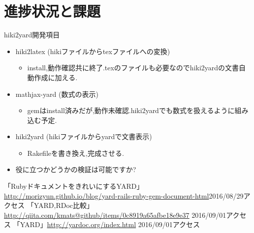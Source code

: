 \documentclass[10pt,a4j,twocolumn]{jsarticle}
\begin{document}
\section{進捗状況と課題}
hiki2yard開発項目
\begin{itemize}
\item hiki2latex (hikiファイルからtexファイルへの変換)\begin{itemize}
\item install,動作確認共に終了.texのファイルも必要なのでhiki2yardの文書自動作成に加える.
\end{itemize}
\item mathjax-yard  (数式の表示)\begin{itemize}
\item gemはinstall済みだが,動作未確認.hiki2yardでも数式を扱えるように組み込む予定.
\end{itemize}
\item hiki2yard (hikiファイルからyardで文書表示)\begin{itemize}
\item Rakefileを書き換え,完成させる.
\end{itemize}
\end{itemize}\begin{itemize}
\item 役に立つかどうかの検証は可能ですか?
\end{itemize}

\begin{thebibliography}{3}
「RubyドキュメントをきれいにするYARD」\url{http://morizyun.github.io/blog/yard-rails-ruby-gem-document-html}2016/08/29アクセス
「YARD,RDoc比較」\url{http://qiita.com/kmats@github/items/0c8919a65afbe18e9e37} 2016/09/01アクセス
「YARD」\url{http://yardoc.org/index.html} 2016/09/01アクセス
\end{thebibliography}
\end{document}
